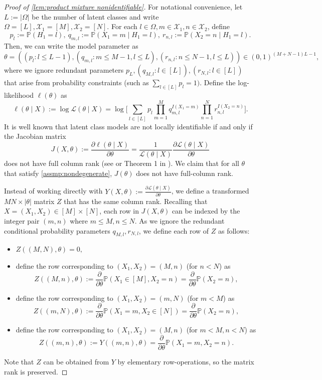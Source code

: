 \documentclass[10pt]{article} %
\newcommand{\PP}{\mathbb P}
\newcommand{\mcx}{\mathcal X}
\begin{document}
\begin{proof}[Proof of \cref{lem:product mixture nonidentifiable}]
    For notational convenience, let $L := |\Omega|$ be the number of latent classes and write $\Omega = [L], \mcx_1 = [M], \mcx_2 = [N]$. 
    For each $l \in \Omega, m \in \mcx_1, n \in \mcx_2$, define 
    $$p_l := \PP(H_1 = l), ~q_{m,l} := \PP(X_1 = m \mid H_1 = l), ~ r_{n,l} := \PP(X_2 = n \mid H_1 = l).$$
    Then, we can write the model parameter as $$\theta = ((p_l : l \le L-1), (q_{m,l}: m \le M-1, l \le L), (r_{n,l}: n \le N-1, l \le L)) \in (0,1)^{(M+N-1)L-1},$$ where we ignore redundant parameters $p_L, (q_{M,l}: l \in [L]), (r_{N,l}: l \in [L])$ that arise from probability constraints (such as $\sum_{l \in [L]} p_l = 1)$.
    Define the log-likelihood $\ell(\theta)$ as
    $$\ell(\theta \mid X) := \log \mathcal{L}(\theta \mid X) = \log \Big[\sum_{l \in [L]} p_l \prod_{m=1}^M q_{m,l}^{I(X_1 = m)} \prod_{n=1}^N r_{n,l}^{I(X_2 = n)}\Big].$$
    It is well known that latent class models are not locally identifiable if and only if the Jacobian matrix $$J(X, \theta) := \frac{\partial \ell(\theta \mid X)}{\partial \theta} = \frac{1}{\mathcal{L}(\theta \mid X)} \frac{\partial \mathcal{L}(\theta \mid X)}{\partial \theta}$$ does not have full column rank (see \cite{goodman1974exploratory} or Theorem 1 in \cite{ouyang2022identifiability}). We claim that for all $\theta$ that satisfy \cref{assmp:nondegenerate}, $J(\theta)$ does not have full-column rank.

    Instead of working directly with $Y(X, \theta) := \frac{\partial \mathcal{L}(\theta \mid X)}{\partial \theta}$, we define a transformed $MN \times |\theta|$ matrix $Z$ that has the same column rank. 
    Recalling that $X = (X_1, X_2) \in [M]\times [N]$, each row in $J(X, \theta)$ can be indexed by the integer pair $(m, n)$ where $m \le M, n \le N$. As we ignore the redundant conditional probability parameters $q_{M,l}, r_{N,l}$, we define each row of $Z$ as follows:
    \begin{itemize}
        \item $Z((M,N), \theta) = 0,$
        \item define the row corresponding to $(X_1,X_2) =(M,n)$ (for $n <N$) as 
        $$Z((M,n), \theta) := \frac{\partial}{\partial \theta} \PP(X_1 \in [M], X_2 = n) = \frac{\partial}{\partial \theta} \PP(X_2 = n),$$
        \item define the row corresponding to $(X_1,X_2) =(m,N)$ (for $m<M$) as 
        $$Z((m,N), \theta) := \frac{\partial}{\partial \theta} \PP(X_1 =m, X_2 \in[N]) = \frac{\partial}{\partial \theta} \PP(X_2 = n),$$
        \item define the row corresponding to $(X_1,X_2) =(M,n)$ (for $m<M, n <N$) as
        $$Z((m,n), \theta) := Y((m,n), \theta) = \frac{\partial}{\partial \theta} \PP(X_1 =m, X_2 = n).$$
    \end{itemize}
    Note that $Z$ can be obtained from $Y$ by elementary row-operations, so the matrix rank is preserved. 


\end{proof}
\end{document}
